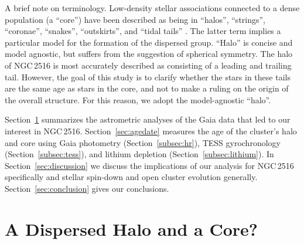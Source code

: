 \documentclass[12pt,twocolumn,tighten]{aastex63}
\newcommand{\cn}{NGC\,2516} %
\begin{document}
A brief note on terminology.  Low-density stellar associations
connected to a dense population (a ``core'') have been described as
being in ``halos'', ``strings'', ``coronae'', ``snakes'',
``outskirts'', and ``tidal tails'' \citep[{\it
e.g.},][]{davenport_death_2010,kounkel_untangling_2019,roser_hyades_2019,tian_discovery_2020,meingast_2021}.
The latter term implies a particular model for the formation of the
dispersed group.  ``Halo'' is concise and model agnostic, but suffers
from the suggestion of spherical symmetry.  The halo of NGC\,2516 is
most accurately described as consisting of a leading and trailing
tail. However, the goal of this study is to clarify whether the stars
in these tails are the same age as stars in the core, and not to make
a ruling on the origin of the overall structure.  For this reason, we
adopt the model-agnostic ``halo''.

Section~\ref{sec:gaia} summarizes the astrometric analyses of the Gaia
data that led to our interest in \cn.  Section~\ref{sec:agedate}
measures the age of the cluster's halo and core using Gaia photometry
(Section~\ref{subsec:hr}), TESS gyrochronology
(Section~\ref{subsec:tess}), and lithium depletion
(Section~\ref{subsec:lithium}).  In Section~\ref{sec:discussion} we
discuss the implications of our analysis for NGC\,2516 specifically
and stellar spin-down and open cluster evolution generally.
Section~\ref{sec:conclusion} gives our conclusions.


\section{A Dispersed Halo and a Core?}
\label{sec:gaia}
\end{document}

